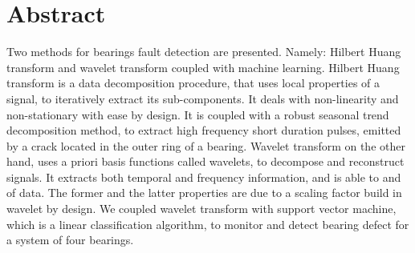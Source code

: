 \documentclass[../Main/thesis.tex]{subfiles}
\begin{document}
\null\vfill
{}
\chapter*{Abstract}
Two methods for bearings fault detection are presented. Namely: Hilbert Huang transform and wavelet transform coupled with machine learning. Hilbert Huang transform is a data decomposition procedure, that uses local properties of a signal, to iteratively extract its sub-components. It deals with non-linearity and non-stationary with ease by design. It is coupled with a robust seasonal trend decomposition method, to extract high frequency short duration pulses, emitted by a crack located in the outer ring of a bearing. Wavelet transform on the other hand, uses a priori basis functions called wavelets, to decompose and reconstruct signals. It extracts both temporal and frequency information, and is able to  and  of data. The former and the latter properties are due to a scaling factor build in wavelet by design.
We coupled wavelet transform with support vector machine, which is a linear classification algorithm, to monitor and detect bearing defect for a system of four bearings.

\vfill\vfill
\clearpage
\blankpage
\end{document}
